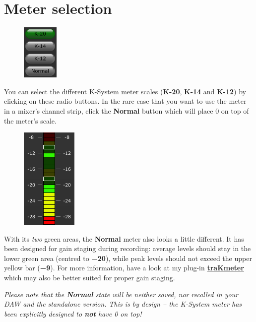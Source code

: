 \section{Meter selection}

\begin{figure}
  \includegraphics[scale=\screenshotscale,clip]{include/images/button_meter_selection.png}
\end{figure}

You can select the different K-System meter scales (\textbf{K-20},
\textbf{K-14} and \textbf{K-12}) by clicking on these radio buttons.
In the rare case that you want to use the meter in a mixer's channel
strip, click the \textbf{Normal} button which will place \SI{0}{\dBFS}
on top of the meter's scale.

\begin{figure}
  \includegraphics[scale=0.49,clip]{include/images/kmeter_normal_scale.png}
\end{figure}

With its \emph{two} green areas, the \textbf{Normal} meter also looks
a little different.  It has been designed for gain staging during
recording: average levels should stay in the lower green area (centred
to \textbf{\SI{-20}{\dBFS}}), while peak levels should not exceed the
upper yellow bar (\textbf{\SI{-9}{\dBFS}}).  For more information,
have a look at my plug-in
\href{http://code.mzuther.de/}{\textbf{traKmeter}} which may also be
better suited for proper gain staging.

\emph{Please note that the \textbf{Normal} state will be neither
  saved, nor recalled in your DAW and the standalone version.  This is
  by design -- the K-System meter has been explicitly designed to
  \textbf{not} have \SI{0}{\dBFS} on top!}

